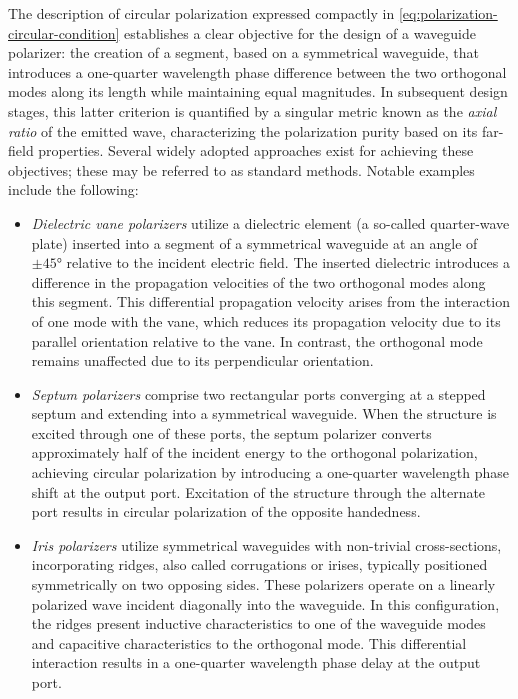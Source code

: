 \documentclass[14pt,a4paper]{ntust_report}
\begin{document}
The description of circular polarization expressed compactly in \cref{eq:polarization-circular-condition} establishes a clear objective for the design of a waveguide polarizer: the creation of a segment, based on a symmetrical waveguide, that introduces a one-quarter wavelength phase difference between the two orthogonal modes along its length while maintaining equal magnitudes. In subsequent design stages, this latter criterion is quantified by a singular metric known as the \emph{axial ratio} of the emitted wave, characterizing the polarization purity based on its far-field properties. Several widely adopted approaches exist for achieving these objectives; these may be referred to as standard methods. Notable examples include the following:
\begin{itemize}
    \item \emph{Dielectric vane polarizers} utilize a dielectric element (a so-called quarter-wave plate) inserted into a segment of a symmetrical waveguide at an angle of $\pm \ang{45}$ relative to the incident electric field. The inserted dielectric introduces a difference in the propagation velocities of the two orthogonal modes along this segment. This differential propagation velocity arises from the interaction of one mode with the vane, which reduces its propagation velocity due to its parallel orientation relative to the vane. In contrast, the orthogonal mode remains unaffected due to its perpendicular orientation.

    \item \emph{Septum polarizers} comprise two rectangular ports converging at a stepped septum and extending into a symmetrical waveguide. When the structure is excited through one of these ports, the septum polarizer converts approximately half of the incident energy to the orthogonal polarization, achieving circular polarization by introducing a one-quarter wavelength phase shift at the output port. Excitation of the structure through the alternate port results in circular polarization of the opposite handedness.

    \item \emph{Iris polarizers} utilize symmetrical waveguides with non-trivial cross-sections, incorporating ridges, also called corrugations or irises, typically positioned symmetrically on two opposing sides. These polarizers operate on a linearly polarized wave incident diagonally into the waveguide. In this configuration, the ridges present inductive characteristics to one of the waveguide modes and capacitive characteristics to the orthogonal mode. This differential interaction results in a one-quarter wavelength phase delay at the output port.
\end{itemize}
\end{document}
